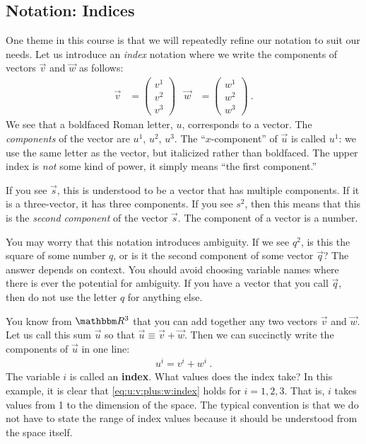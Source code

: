 \documentclass[12pt]{article}
\begin{document}
\subsection{Notation: Indices}

One theme in this course is that we will repeatedly refine our notation to suit our needs. Let us introduce an \emph{index} notation where we write the components of vectors $\vec{v}$ and $\vec{w}$ as follows:
\begin{align}
    \vec{v}
    &=
    \begin{pmatrix}
        v^1 \\ v^2 \\ v^3
    \end{pmatrix}
    &
    \vec{w}
    &=
    \begin{pmatrix}
        w^1 \\ w^2 \\ w^3
    \end{pmatrix} \ .
\end{align}
We see that a boldfaced Roman letter, $u$, corresponds to a vector. The \emph{components} of the vector are $u^1$, $u^2$, $u^3$. The ``$x$-component'' of $\vec{u}$ is called $u^1$: we use the same letter as the vector, but italicized rather than boldfaced. The upper index is \emph{not} some kind of power, it simply means ``the first component.'' 

\begin{example}
If you see $\vec{s}$, this is understood to be a vector that has multiple components. If it is a three-vector, it has three components. If you see $s^2$, then this means that this is the \emph{second component} of the vector $\vec{s}$. The component of a vector is a number. 
\end{example}

You may worry that this notation introduces ambiguity. If we see $q^2$, is this the square of some number $q$, or is it the second component of some vector $\vec{q}$? The answer depends on context. You should avoid choosing variable names where there is ever the potential for ambiguity. If you have a vector that you call $\vec{q}$, then do not use the letter $q$ for anything else.



You know from $\RR ^3$ that you can add together any two vectors $\vec{v}$ and $\vec{w}$.
% 
Let us call this sum $\vec{u}$ so that $\vec{u}\equiv \vec{v}+\vec{w}$. Then we can succinctly write the components of $\vec{u}$ in one line:
\begin{align}
    u^i = v^i + w^i \ .
    \label{eq:u:v:plus:w:index}
\end{align}
The variable $i$ is called an \textbf{index}. What values does the index take? In this example, it is 
clear that \eqref{eq:u:v:plus:w:index} holds for $i=1,2,3$. That is, $i$ takes values from 1 to the dimension of the space. The typical convention is that we do not have to state the range of index values because it should be understood from the space itself. 
\end{document}

